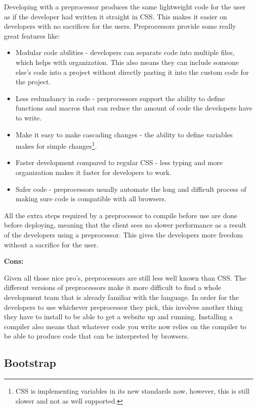 \documentclass[draftclsnofoot,onecolumn,letterpaper,10pt,compsoc]{IEEEtran}
\begin{document}
     Developing with a preprocessor produces the same lightweight code for the user as if the developer had written it straight in CSS. This makes it easier on developers with no sacrifices for the users. Preprocessors provide some really great features like:
     \begin{itemize}
       \item Modular code abilities - developers can separate code into multiple files, which helps with organization. This also means they can include someone else's code into a project without directly pasting it into the custom code for the project.\cite{sass}
       \item Less redundancy in code - preprocessors support the ability to define functions and macros that can reduce the amount of code the developers have to write.
       \item Make it easy to make cascading changes - the ability to define variables makes for simple changes\footnote{CSS is implementing variables in its new standards now, however, this is still slower and not as well supported.}.
       \item Faster development compared to regular CSS - less typing and more organization makes it faster for developers to work.\cite{sass}
       \item Safer code - preprocessors usually automate the long and difficult process of making sure code is compatible with all browsers.
     \end{itemize}

     All the extra steps required by a preprocessor to compile before use are done before deploying, meaning that the client sees no slower performance as a result of the developers using a preprocessor.
     This gives the developers more freedom without a sacrifice for the user.

    \textbf{Cons:}

    Given all those nice pro's, preprocessors are still less well known than CSS.
    The different versions of preprocessors make it more difficult to find a whole development team that is already familiar with the language.
    In order for the developers to use whichever preprocessor they pick, this involves another thing they have to install to be able to get a website up and running.
    Installing a compiler also means that whatever code you write now relies on the compiler to be able to produce code that can be interpreted by browsers.


	\subsection{Bootstrap}
\end{document}
